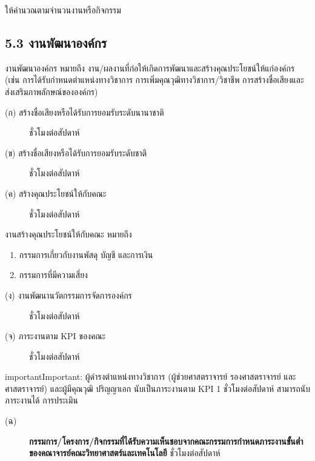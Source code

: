 \documentclass[a4paper,12pt,english]{sphinxmanual}
\begin{document}
ให้คำนวณตามจำนวนงานหรือกิจกรรม


\subsection{5.3 งานพัฒนาองค์กร}
\label{\detokenize{workload_rubric:id95}}
งานพัฒนาองค์กร หมายถึง งาน/ผลงานที่ก่อให้เกิดการพัฒนาและสร้างคุณประโยชน์ให้แก่องค์กร (เช่น การได้รับกำหนดตำแหน่งทางวิชาการ การเพิ่มคุณวุฒิทางวิชาการ/วิชาชีพ การสร้างชื่อเสียงและส่งเสริมภาพลักษณ์ขององค์กร)
\begin{description}
\item[{(ก) สร้างชื่อเสียงหรือได้รับการยอมรับระดับนานาชาติ}]  ชั่วโมงต่อสัปดาห์

\item[{(ข) สร้างชื่อเสียงหรือได้รับการยอมรับระดับชาติ}]  ชั่วโมงต่อสัปดาห์

\item[{(ค) สร้างคุณประโยชน์ให้กับคณะ}]  ชั่วโมงต่อสัปดาห์

\end{description}

งานสร้างคุณประโยชน์ให้กับคณะ หมายถึง
\begin{enumerate}
%
\item {} 
กรรมการเกี่ยวกับงานพัสดุ บัญชี และการเงิน

\item {} 
กรรมการที่มีความเสี่ยง

\end{enumerate}
\begin{description}
\item[{(ง) งานพัฒนานวัตกรรมการจัดการองค์กร}]  ชั่วโมงต่อสัปดาห์

\item[{(จ) ภาระงานตาม KPI ของคณะ}]  ชั่วโมงต่อสัปดาห์

\end{description}

\begin{sphinxadmonition}{important}{Important:}
ผู้ดำรงตำแหน่งทางวิชาการ (ผู้ช่วยศาสตราจารย์ รองศาสตราจารย์ และศาสตราจารย์) และผู้มีคุณวุฒิ ปริญญาเอก นับเป็นภาระงานตาม KPI 1 ชั่วโมงต่อสัปดาห์ สามารถนับภาระงานได้  การประเมิน
\end{sphinxadmonition}
\begin{description}
\item[{(ฉ)}] \textbf{กรรมการ/โครงการ/กิจกรรมที่ได้รับความเห็นชอบจากคณะกรรมการกำหนดภาระงานขั้นต่ำ ของคณาจารย์คณะวิทยาศาสตร์และเทคโนโลยี}  ชั่วโมงต่อสัปดาห์

\end{description}
\end{document}
